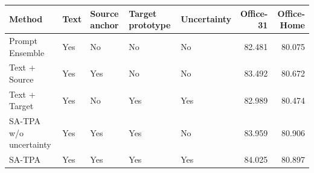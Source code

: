 \begin{tabular}{lllllrr}
\toprule
Method & Text & Source anchor & Target prototype & Uncertainty & Office-31 & Office-Home \\
\midrule
Prompt Ensemble & Yes & No & No & No & 82.481 & 80.075 \\
Text + Source & Yes & Yes & No & No & 83.492 & 80.672 \\
Text + Target & Yes & No & Yes & Yes & 82.989 & 80.474 \\
SA-TPA w/o uncertainty & Yes & Yes & Yes & No & 83.959 & 80.906 \\
SA-TPA & Yes & Yes & Yes & Yes & 84.025 & 80.897 \\
\bottomrule
\end{tabular}
